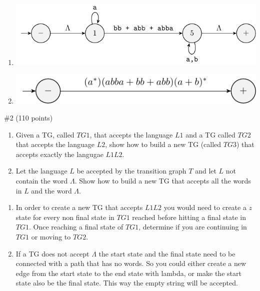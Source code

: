 \begin{solution}
\begin{enumerate}[label={\bf \alph*)}]
\begin{enumerate}[label=\arabic*]
            \item \includegraphics[]{figures/answer/Answer1B3.pdf}
            \item \includegraphics[]{figures/answer/Answer1B4.pdf}
        \end{enumerate}
    \end{enumerate}
\end{solution}

\begin{problem}{\#2 (110 points)}
    \begin{enumerate}[label={\bf \alph*)}]
        \item Given a TG, called \(TG1\), that accepts the language \(L1\) and a TG called \(TG2\) that accepts the language \(L2\), show how to build a new TG (called \(TG3\)) that accepts exactly the langugae \(L1L2\).
        \item Let the language \(L\) be accepted by the transition graph \(T\) and let \(L\) not contain the word \(\Lambda\).
        Show how to build a new TG that accepts all the words in \(L\) and the word \(\Lambda\).
    \end{enumerate}
\end{problem}
\vspace{2em}
\begin{solution}
    \begin{enumerate}[label=\alph*)]
        \item In order to create a new TG that accepts \(L1L2\) you would need to create a \(z\) state for every non final state in \(TG1\) reached before hitting a final state in \(TG1\).
        Once reaching a final state of \(TG1\), determine if you are continuing in \(TG1\) or moving to \(TG2\).
        \item If a TG does not accept \(\Lambda\) the start state and the final state need to be connected with a path that has no words.
        So you could either create a new edge from the start state to the end state with lambda, or make the start state also be the final state.
        This way the empty string will be accepted.
    \end{enumerate}
\end{solution}

